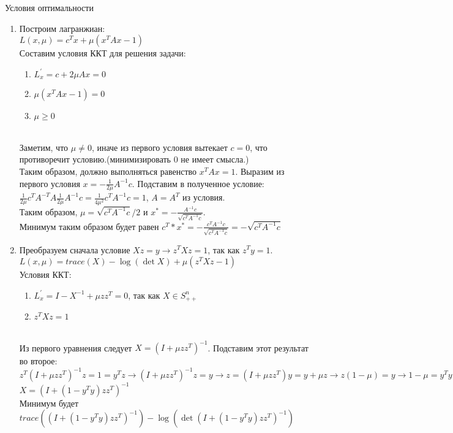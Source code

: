 \documentclass[12pt]{extreport}
\theoremstyle{definiton}
\theoremstyle{definition}
\theoremstyle{definition}
\let\geq\geqslant
\begin{document}
	\PR[] Условия оптимальности
    \begin{enumerate} 
        \item Построим лагранжиан:
        \\$L(x,\mu) = c^Tx + \mu(x^TAx-1)$
        \\ Составим условия ККТ для решения задачи:
        \begin{enumerate}
            \item $L_x^{'}=c+2\mu Ax=0$
            \item $\mu(x^TAx-1)=0$
            \item $\mu \geq 0$
        \end{enumerate}
        \\ Заметим, что $\mu \neq 0$, иначе из первого условия вытекает $c=0$, что противоречит условию.(минимизировать 0 не имеет смысла.)
        \\Таким образом, должно выполняться равенство $x^TAx=1$. Выразим из первого условия $x=-\frac{1}{2\mu}A^{-1}c$. Подставим в полученное условие:
        \\$\frac{1}{2\mu}c^TA^{-T}A\frac{1}{2\mu}A^{-1}c=\frac{1}{4\mu^2}c^TA^{-1}c=1$, $A=A^T$ из условия.
        \\Таким образом, $\mu = \sqrt{c^TA^{-1}c}/2$ и $x^* = -\frac{A^{-1}c}{\sqrt{c^TA^{-1}c}}$.
        \\ Минимум таким образом будет равен $c^T*x^*=-\frac{c^TA^{-1}c}{\sqrt{c^TA^{-1}c}}=-\sqrt{c^TA^{-1}c}$
        \item Преобразуем сначала условие $Xz=y \to z^TXz=1$, так как $z^Ty=1$.
        \\$L(x,\mu) = trace(X)-\log(\det X) + \mu(z^TXz-1)$
        \\ Условия ККТ:
        \begin{enumerate}
            \item $L_x^{'}=I-X^{-1}+\mu zz^T=0$, так как $X \in S_{++}^n$
            \item $z^TXz=1$
        \end{enumerate}
        \\Из первого уравнения следует $X = (I + \mu zz^T)^{-1}$. Подставим этот результат во второе: $z^T(I + \mu zz^T)^{-1}z=1=y^Tz \to (I + \mu zz^T)^{-1}z=y \to z = (I + \mu zz^T)y = y + \mu z \to z(1-\mu) = y \to 1 -\mu = y^Ty \to \mu = 1 - y^Ty$
        \\ $X = (I+(1 - y^Ty)zz^T)^{-1}$
        \\ Минимум будет $trace((I+(1 - y^Ty)zz^T)^{-1})-\log(\det (I+(1 - y^Ty)zz^T)^{-1})$

\end{enumerate}
\end{document}
